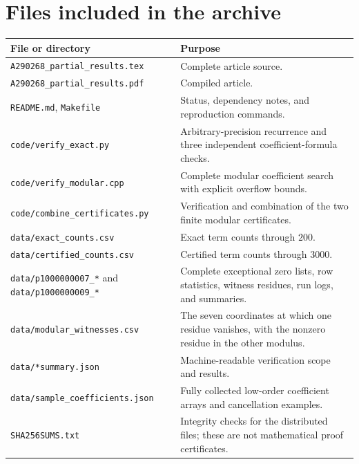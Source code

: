 \documentclass[11pt]{article}
\numberwithin{equation}{section}
\theoremstyle{definition}
\theoremstyle{remark}
\begin{document}
\section{Files included in the archive}
\begin{longtable}{@{}>{\raggedright\arraybackslash}p{}>{\raggedright\arraybackslash}p{}@{}}
\toprule
File or directory & Purpose\\
\midrule
\endhead
\texttt{A290268\_partial\_results.tex} & Complete article source.\\
\texttt{A290268\_partial\_results.pdf} & Compiled article.\\
\texttt{README.md}, \texttt{Makefile} & Status, dependency notes, and reproduction commands.\\
\texttt{code/verify\_exact.py} & Arbitrary-precision recurrence and three independent coefficient-formula checks.\\
\texttt{code/verify\_modular.cpp} & Complete modular coefficient search with explicit overflow bounds.\\
\texttt{code/combine\_certificates.py} & Verification and combination of the two finite modular certificates.\\
\texttt{data/exact\_counts.csv} & Exact term counts through $200$.\\
\texttt{data/certified\_counts.csv} & Certified term counts through $3000$.\\
\texttt{data/p1000000007\_*} and \texttt{data/p1000000009\_*} & Complete exceptional zero lists, row statistics, witness residues, run logs, and summaries.\\
\texttt{data/modular\_witnesses.csv} & The seven coordinates at which one residue vanishes, with the nonzero residue in the other modulus.\\
\texttt{data/*summary.json} & Machine-readable verification scope and results.\\
\texttt{data/sample\_coefficients.json} & Fully collected low-order coefficient arrays and cancellation examples.\\
\texttt{SHA256SUMS.txt} & Integrity checks for the distributed files; these are not mathematical proof certificates.\\
\bottomrule
\end{longtable}
\end{document}
